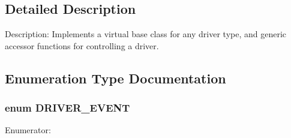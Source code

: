 \subsection{Detailed Description}
Description: Implements a virtual base class for any driver type, and generic accessor functions for controlling a driver. 

\subsection{Enumeration Type Documentation}
\subsubsection[{DRIVER\_\-EVENT}]{\setlength{\rightskip}{0pt plus 5cm}enum {\bf DRIVER\_\-EVENT}}\label{driver_8h_afb4adb9fac6a75d43c2ffb22283630f9}
\begin{Desc}
\item[Enumerator: ]\par
\begin{description}
\item[{\em 
DRIVER\_\-RX\_\-BYTE\label{driver_8h_afb4adb9fac6a75d43c2ffb22283630f9a86e9e1ed064ba15a8202aa7e0f8c9772}
}]\item[{\em 
DRIVER\_\-TX\_\-BYTE\label{driver_8h_afb4adb9fac6a75d43c2ffb22283630f9a53f52843ccbf8421ddd100a113608319}
}]\item[{\em 
DRIVER\_\-TX\_\-STRING\label{driver_8h_afb4adb9fac6a75d43c2ffb22283630f9ac1af632aa728c26a47a35702b4672e39}
}]\item[{\em 
DRIVER\_\-EVENTS\label{driver_8h_afb4adb9fac6a75d43c2ffb22283630f9ad957e7eebbe3b2aa2e524bf4dd7fd5b4}
}]\end{description}
\end{Desc}

